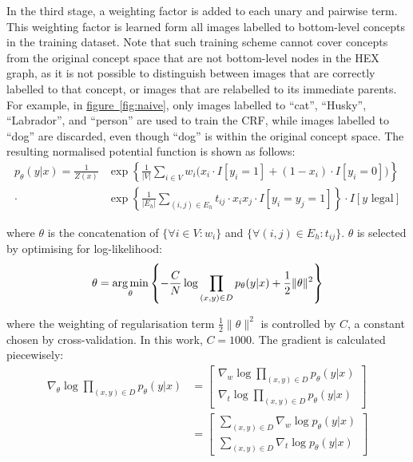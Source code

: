 \documentclass[11pt,a4paper]{article}
\newcommand{\argmin}{\operatornamewithlimits{arg\,min}}
\begin{document}
In the third stage, a weighting factor is added to each unary and pairwise term. This weighting factor is learned form all images labelled to bottom-level concepts in the training dataset. Note that such training scheme cannot cover concepts from the original concept space that are not bottom-level nodes in the HEX graph, as it is not possible to distinguish between images that are correctly labelled to that concept, or images that are relabelled to its immediate parents. For example, in \hyperref[fig:naive]{figure~\ref{fig:naive}}, only images labelled to ``cat'', ``Husky'', ``Labrador'', and ``person'' are used to train the CRF, while images labelled to ``dog'' are discarded, even though ``dog'' is within the original concept space. The resulting normalised potential function is shown as follows:
\begin{align}
p_\theta(y|x)=\frac{1}{Z(x)}&\exp\left\{\frac{1}{|V|}\sum_{i\in V}w_i\big(x_i\cdot I[y_i=1]+(1-x_i)\cdot I[y_i=0]\big)\right\}\nonumber\\
\cdot&\exp\left\{\frac{1}{|E_h|}\sum_{(i,j)\in E_h}t_{ij}\cdot x_ix_j\cdot I[y_i=y_j=1]\right\}\cdot I[y\text{ legal}]
\end{align}

where $\theta$ is the concatenation of $\{\forall i\in V:w_i\}$ and $\{\forall(i,j)\in E_h:t_{ij}\}$. $\theta$ is selected by optimising for log-likelihood:
\begin{equation}
\theta=\argmin_\theta\left\{-\frac{C}{N}\log\prod_{(x,y)\in D}p_\theta(y|x)+\frac{1}{2}\|\theta\|^2\right\}
\end{equation}

where the weighting of regularisation term $\frac{1}{2}\|\theta\|^2$ is controlled by $C$, a constant chosen by cross-validation. In this work, $C=1000$. The gradient is calculated piecewisely:
\begin{align}
\nabla_\theta\log\prod_{(x,y)\in D}p_\theta(y|x)&=\begin{bmatrix}
\nabla_w\log\prod_{(x,y)\in D}p_\theta(y|x)\\ 
\nabla_t\log\prod_{(x,y)\in D}p_\theta(y|x)
\end{bmatrix}\nonumber\\
&=\begin{bmatrix}
\sum_{(x,y)\in D}\nabla_w\log p_\theta(y|x)\\ 
\sum_{(x,y)\in D}\nabla_t\log p_\theta(y|x)
\end{bmatrix}
\label{eqn:nablatheta}
\end{align}
\end{document}
